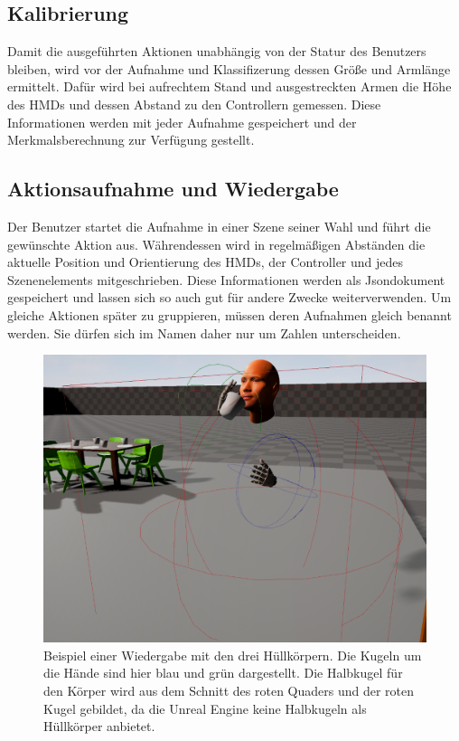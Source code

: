 \subsection{Kalibrierung}
Damit die ausgeführten Aktionen unabhängig von der Statur des Benutzers bleiben, wird vor der Aufnahme und Klassifizerung dessen Größe und Armlänge ermittelt. Dafür wird bei aufrechtem Stand und ausgestreckten Armen die Höhe des HMDs und dessen Abstand zu den Controllern gemessen. Diese Informationen werden mit jeder Aufnahme gespeichert und der Merkmalsberechnung zur Verfügung gestellt. 

\subsection{Aktionsaufnahme und Wiedergabe}
\label{subsec:aktionsaufnahme-und-wiedergabe}
Der Benutzer startet die Aufnahme in einer Szene seiner Wahl und führt die gewünschte Aktion aus. Währendessen wird in regelmäßigen Abständen die aktuelle Position und Orientierung des HMDs, der Controller und jedes Szenenelements mitgeschrieben. Diese Informationen werden als Jsondokument gespeichert und lassen sich so auch gut für andere Zwecke weiterverwenden. Um gleiche Aktionen später zu gruppieren, müssen deren Aufnahmen gleich benannt werden. Sie dürfen sich im Namen daher nur um Zahlen unterscheiden.\newline
\begin{figure}[hbtp]
\includegraphics[width=1.0\linewidth]{PlaybackActor.png}
\caption{Beispiel einer Wiedergabe mit den drei Hüllkörpern. Die Kugeln um die Hände sind hier blau und grün dargestellt. Die Halbkugel für den Körper wird aus dem Schnitt des roten Quaders und der roten Kugel gebildet, da die Unreal Engine keine Halbkugeln als Hüllkörper anbietet.}
\label{fig:playback-actor}
\end{figure}

